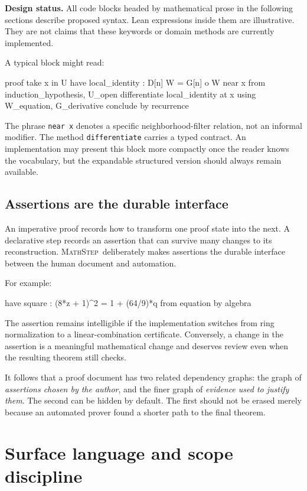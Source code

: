 \documentclass[11pt,a4paper]{article}
\theoremstyle{remark}
\newcommand{\ms}{\textsc{MathStep}}
\newcommand{\ty}[1]{\texttt{#1}}
\newcommand{\designnote}[1]{\par\smallskip\noindent\colorbox{light}{\parbox{\dimexpr\linewidth-2\fboxsep\relax}{\textbf{Design status.} #1}}\par\smallskip}
\begin{document}
\designnote{All code blocks headed by mathematical prose in the following sections describe proposed syntax. Lean expressions inside them are illustrative. They are not claims that these keywords or domain methods are currently implemented.}

A typical block might read:
\Needspace{106pt}
\begin{code}
proof
  take x in U
  have local_identity : D[n] W = G[n] o W near x
    from induction_hypothesis, U_open
  differentiate local_identity at x
    using W_equation, G_derivative
  conclude by recurrence
\end{code}
The phrase \ty{near x} denotes a specific neighborhood-filter relation, not an informal modifier. The method \ty{differentiate} carries a typed contract. An implementation may present this block more compactly once the reader knows the vocabulary, but the expandable structured version should always remain available.

\subsection{Assertions are the durable interface}
An imperative proof records how to transform one proof state into the next. A declarative step records an assertion that can survive many changes to its reconstruction. \ms\ deliberately makes assertions the durable interface between the human document and automation.

For example:
\Needspace{46pt}
\begin{code}
have square : (8*z + 1)^2 = 1 + (64/9)*q
  from equation by algebra
\end{code}
The assertion remains intelligible if the implementation switches from ring normalization to a linear-combination certificate. Conversely, a change in the assertion is a meaningful mathematical change and deserves review even when the resulting theorem still checks.

It follows that a proof document has two related dependency graphs: the graph of \emph{assertions chosen by the author}, and the finer graph of \emph{evidence used to justify them}. The second can be hidden by default. The first should not be erased merely because an automated prover found a shorter path to the final theorem.

\section{Surface language and scope discipline}\label{sec:surface}
\end{document}
